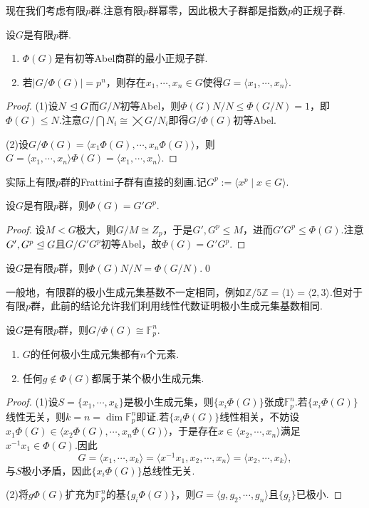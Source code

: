 现在我们考虑有限$p$群.注意有限$p$群幂零，因此极大子群都是指数$p$的正规子群.
\begin{prop}
	设$G$是有限$p$群.
	\begin{enumerate}
		\item $\Phi(G)$是有初等Abel商群的最小正规子群.
		\item 若$|G/\Phi(G)|=p^n$，则存在$x_1,\cdots,x_n\in G$使得$G=\langle x_1,\cdots,x_n\rangle $.
	\end{enumerate}
\end{prop}
\begin{proof}
	\hspace*{5.2pt}(1)设$N\trianglelefteq G$而$G/N$初等Abel，则$\Phi(G)N/N\le\Phi(G/N)=1$，即$\Phi(G)\le N$.注意$G/\bigcap N_i\cong\bigtimes G/N_i$即得$G/\Phi(G)$初等Abel.

	(2)设$G/\Phi(G)=\langle x_1\Phi(G),\cdots,x_n\Phi(G)\rangle $，则$G=\langle x_1,\cdots,x_n\rangle\Phi(G)=\langle x_1,\cdots,x_n\rangle $.
\end{proof}

实际上有限$p$群的Frattini子群有直接的刻画.记$G^p:=\langle x^p\mid x\in G\rangle $.
\begin{prop}
	设$G$是有限$p$群，则$\Phi(G)=G'G^p$.
\end{prop}
\begin{proof}
	设$M<G$极大，则$G/M\cong Z_p$，于是$G',G^p\le M$，进而$G'G^p\le\Phi(G)$.注意$G',G^p\trianglelefteq G$且$G/G'G^p$初等Abel，故$\Phi(G)=G'G^p$.
\end{proof}
\begin{cor}
	设$G$是有限$p$群，则$\Phi(G)N/N=\Phi(G/N)$.\qed
\end{cor}

一般地，有限群的极小生成元集基数不一定相同，例如$\mathbb{Z}/5\mathbb{Z}=\langle 1\rangle=\langle 2,3\rangle 	$.但对于有限$p$群，此前的结论允许我们利用线性代数证明极小生成元集基数相同.
\begin{thm}[(Burnside)]
	设$G$是有限$p$群，则$G/\Phi(G)\cong\mathbb{F}_p^n$.
	\begin{enumerate}
		\item $G$的任何极小生成元集都有$n$个元素.
		\item 任何$g\notin\Phi(G)$都属于某个极小生成元集.
	\end{enumerate}
\end{thm}
\begin{proof}
	\hspace*{5.2pt}(1)设$S=\{x_1,\cdots,x_k\}$是极小生成元集，则$\{x_i\Phi(G)\}$张成$\mathbb{F}_p^n$.若$\{x_i\Phi(G)\}$线性无关，则$k=n=\dim\mathbb{F}_p^n$即证.若$\{x_i\Phi(G)\}$线性相关，不妨设$x_1\Phi(G)\in\langle x_2\Phi(G),\cdots,x_n\Phi(G)\rangle $，于是存在$x\in\langle x_2,\cdots,x_n\rangle $满足$x^{-1}x_1\in\Phi(G)$.因此
	\[
		G=\langle x_1,\cdots,x_k\rangle=\langle x^{-1}x_1,x_2,\cdots,x_n\rangle=\langle x_2,\cdots,x_k\rangle,
	\]
	与$S$极小矛盾，因此$\{x_i\Phi(G)\}$总线性无关.

	(2)将$g\Phi(G)$扩充为$\mathbb{F}_p^n$的基$\{g_i\Phi(G)\}$，则$G=\langle g,g_2,\cdots,g_n\rangle$且$\{g_i\}$已极小.
\end{proof}
